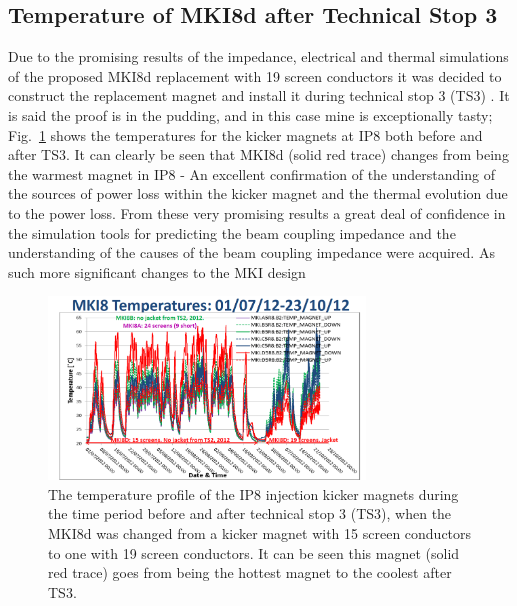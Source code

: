 \subsection{Temperature of MKI8d after Technical Stop 3}

Due to the promising results of the impedance, electrical and thermal simulations of the proposed MKI8d replacement with 19 screen conductors it was decided to construct the replacement magnet and install it during technical stop 3 (TS3) \cite{Barnes:emisMKITemp}. It is said the proof is in the pudding, and in this case mine is exceptionally tasty; Fig.~\ref{fig:heating-mki8-post-ts3} shows the temperatures for the kicker magnets at IP8 both before and after TS3. It can clearly be seen that MKI8d (solid red trace) changes from being the warmest magnet in IP8 - An excellent confirmation of the understanding of the sources of power loss within the kicker magnet and the thermal evolution due to the power loss. From these very promising results a great deal of confidence in the simulation tools for predicting the beam coupling impedance and the understanding of the causes of the beam coupling impedance were acquired. As such more significant changes to the MKI design

\begin{figure}
\begin{center}
\includegraphics[width=0.75\textwidth]{LHC_MKI/figures/mki8-temps-post-ts3.png}
\end{center}
\label{fig:heating-mki8-post-ts3}
\caption{The temperature profile of the IP8 injection kicker magnets during the time period before and after technical stop 3  (TS3), when the MKI8d was changed from a kicker magnet with 15 screen conductors to one with 19 screen conductors. It can be seen this magnet (solid red trace) goes from being the hottest magnet to the coolest after TS3.}
\end{figure}